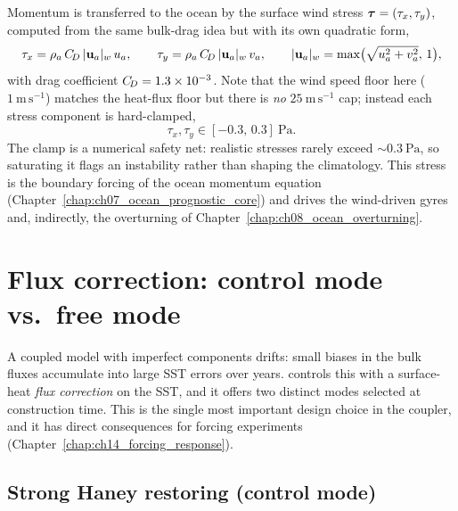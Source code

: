 Momentum is transferred to the ocean by the surface wind stress
$\boldsymbol{\tau}=(\tau_x,\tau_y)$, computed from the same bulk-drag idea but with its own
quadratic form,
\begin{equation}
  \tau_x = \rho_a\,C_{\!D}\,|\mathbf{u}_a|_{w}\,u_a,
  \qquad
  \tau_y = \rho_a\,C_{\!D}\,|\mathbf{u}_a|_{w}\,v_a,
  \qquad
  |\mathbf{u}_a|_{w} = \max\!\big(\sqrt{u_a^2+v_a^2},\,1\big),
  \label{eq:stress}
\end{equation}
with drag coefficient $C_{\!D}=1.3\times10^{-3}$. Note that the wind speed floor here
($1\ \mathrm{m\,s^{-1}}$) matches the heat-flux floor but there is \emph{no}
$25\ \mathrm{m\,s^{-1}}$ cap; instead each stress component is hard-clamped,
\begin{equation}
  \tau_x,\tau_y \in [-0.3,\,0.3]\ \mathrm{Pa}.
  \label{eq:stressclamp}
\end{equation}
The clamp is a numerical safety net: realistic stresses rarely exceed
$\sim\!0.3\ \mathrm{Pa}$, so saturating it flags an instability rather than
shaping the climatology. This stress is the boundary forcing of the ocean
momentum equation (Chapter~\ref{chap:ch07_ocean_prognostic_core}) and drives the
wind-driven gyres and, indirectly, the overturning of
Chapter~\ref{chap:ch08_ocean_overturning}.

\section{Flux correction: control mode vs.\ free mode}\label{sec:fluxcorr}

A coupled model with imperfect components drifts: small biases in the bulk fluxes
accumulate into large SST errors over years. \model{} controls this with a
surface-heat \emph{flux correction} on the SST, and it offers two distinct modes
selected at construction time. This is the single most important design choice in
the coupler, and it has direct consequences for forcing experiments
(Chapter~\ref{chap:ch14_forcing_response}).

\subsection{Strong Haney restoring (control mode)}

